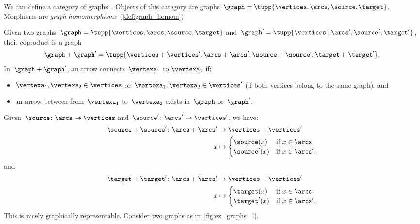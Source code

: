 \begin{example}
	\label{def:ex_graph}
	\index{\Graph}
	We can define a category of graphs~\Graph.
	Objects of this category are graphs~$\graph=\tupp{\vertices,\arcs,\source,\target}$.
	Morphisms are \emph{graph homomorphisms}~(\cref{def:graph_homom})

	Given two graphs~$\graph=\tupp{\vertices,\arcs,\source,\target}$ and~$\graph'=\tupp{\vertices',\arcs',\source',\target'}$, their coproduct is a graph
	\begin{equation*}
		\graph+\graph'=\tupp{\vertices+\vertices',\arcs+\arcs',\source+\source',\target+\target'}.
	\end{equation*}
	In~$\graph+\graph'$, an arrow connects~$\vertexa_1$ to $\vertexa_2$ if:
	\begin{itemize}
		\item $\vertexa_1,\vertexa_2\in \vertices$ or~$\vertexa_1,\vertexa_2\in \vertices'$ (if both vertices belong to the same graph), and
		\item an arrow between from~$\vertexa_1$ to~$\vertexa_2$ exists in~$\graph$ or~$\graph'$.
	\end{itemize}
	Given~$\source \colon \arcs \to \vertices$ and~$\source'\colon \arcs'\to \vertices'$, we have:
	\begin{equation*}
		\begin{aligned}
			\source+ \source'\colon \arcs+ \arcs' & \to \vertices+ \vertices' \\
			x                                     & \mapsto
			\begin{cases}
				\source(x)  & \text{if } x\in \arcs   \\
				\source'(x) & \text{if } x\in \arcs'.
			\end{cases}
		\end{aligned}
	\end{equation*}
	and
	\begin{equation*}
		\begin{aligned}
			\target+\target '\colon \arcs+ \arcs ' & \to \vertices+ \vertices' \\
			x                                      & \mapsto
			\begin{cases}
				\target(x)  & \text{if } x\in \arcs   \\
				\target'(x) & \text{if } x\in \arcs'.
			\end{cases}
		\end{aligned}
	\end{equation*}
	This is nicely graphically representable.
	Consider two graphs as in~\cref{fig:ex_graphs_1}.


\end{example}
